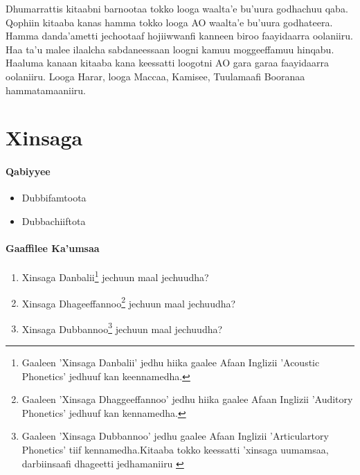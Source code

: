 \documentclass[11pt,b5paper]{book}
\begin{document}
Dhumarrattis kitaabni barnootaa tokko looga waalta’e bu’uura godhachuu qaba. Qophiin kitaaba kanas hamma tokko looga AO waalta’e bu’uura godhateera. Hamma danda’ametti
jechootaaf hojiiwwan\cite{aadaa1995}fi kanneen biroo faayidaarra oolaniiru. Haa ta’u malee ilaalcha sabdaneessaan loogni kamuu moggeeffamuu hinqabu. Haaluma kanaan
kitaaba kana keessatti loogotni AO gara garaa faayidaarra oolaniiru. Looga Harar, looga Maccaa, Kamisee, Tuulamaafi Booranaa hammatamaaniiru\cite{biniyam1988,griefenow2001grammatical,kebede1994}.


\chapter{Xinsaga}
\setlength{\parindent}{3em}
\subsubsection{Qabiyyee}
\begin{itemize}
  \item Dubbifamtoota
  \item Dubbachiiftota
\end{itemize}

\subsubsection{Gaaffilee Ka'umsaa}
\begin{enumerate}
  \item Xinsaga Danbalii\footnote{Gaaleen 'Xinsaga Danbalii' jedhu hiika gaalee Afaan Inglizii 'Acoustic Phonetics' jedhuuf kan keennamedha.} jechuun maal jechuudha?
  \item Xinsaga Dhageeffannoo\footnote{Gaaleen 'Xinsaga Dhaggeeffannoo' jedhu hiika gaalee Afaan Inglizii 'Auditory Phonetics' jedhuuf kan kennamedha.} jechuun maal jechuudha?
  \item Xinsaga Dubbannoo\footnote{Gaaleen 'Xinsaga Dubbannoo' jedhu gaalee Afaan Inglizii 'Articulartory Phonetics' tiif kennamedha.Kitaaba tokko keessatti 'xinsaga uumamsaa, darbiinsaafi dhageetti jedhamaniiru \cite[p.39]{Addunya2018}} jechuun maal jechuudha?
\end{enumerate}
\end{document}
